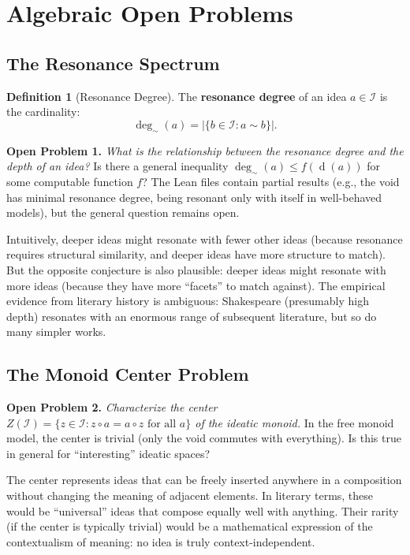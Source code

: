 \documentclass[11pt,openany]{book}
\theoremstyle{definition}
\newtheorem{definition}[axiom]{Definition}
\theoremstyle{plain}
\theoremstyle{remark}
\newcommand{\IS}{\mathcal{I}}               %
\newcommand{\compose}{\circ}                 %
\newcommand{\res}{\sim}                      %
\newcommand{\depth}{\operatorname{d}}       %
\begin{document}
\section{Algebraic Open Problems}

\subsection{The Resonance Spectrum}

\begin{definition}[Resonance Degree]
The \textbf{resonance degree} of an idea $a \in \IS$ is the cardinality:
\[
\deg_{\res}(a) = |\{b \in \IS : a \res b\}|.
\]
\end{definition}

\textbf{Open Problem 1.} \emph{What is the relationship between the resonance degree and the depth of an idea?} Is there a general inequality $\deg_{\res}(a) \leq f(\depth(a))$ for some computable function $f$? The Lean files contain partial results (e.g., the void has minimal resonance degree, being resonant only with itself in well-behaved models), but the general question remains open.

Intuitively, deeper ideas might resonate with fewer other ideas (because resonance requires structural similarity, and deeper ideas have more structure to match). But the opposite conjecture is also plausible: deeper ideas might resonate with more ideas (because they have more ``facets'' to match against). The empirical evidence from literary history is ambiguous: Shakespeare (presumably high depth) resonates with an enormous range of subsequent literature, but so do many simpler works.

\subsection{The Monoid Center Problem}

\textbf{Open Problem 2.} \emph{Characterize the center $Z(\IS) = \{z \in \IS : z \compose a = a \compose z \text{ for all } a\}$ of the ideatic monoid.} In the free monoid model, the center is trivial (only the void commutes with everything). Is this true in general for ``interesting'' ideatic spaces?

The center represents ideas that can be freely inserted anywhere in a composition without changing the meaning of adjacent elements. In literary terms, these would be ``universal'' ideas that compose equally well with anything. Their rarity (if the center is typically trivial) would be a mathematical expression of the contextualism of meaning: no idea is truly context-independent.
\end{document}
